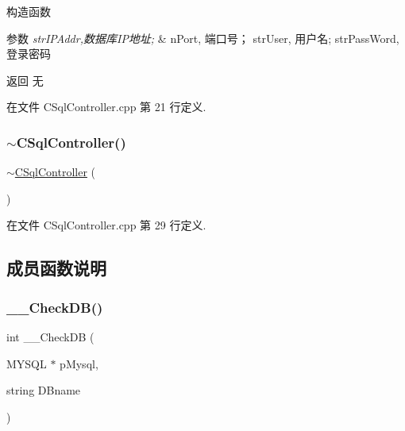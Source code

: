 构造函数 


\begin{DoxyParams}{参数}
{\em str\+I\+P\+Addr,数据库\+I\+P地址;} & n\+Port, 端口号； str\+User, 用户名; str\+Pass\+Word, 登录密码\\
\hline
\end{DoxyParams}
\begin{DoxyReturn}{返回}
无 
\end{DoxyReturn}


在文件 C\+Sql\+Controller.\+cpp 第 21 行定义.

\mbox{\label{class_c_sql_controller_add361c4b54568fcfe57fce584859ee84}} 
\subsubsection{\texorpdfstring{$\sim$\+C\+Sql\+Controller()}{~CSqlController()}}
{\footnotesize\ttfamily $\sim$\hyperlink{class_c_sql_controller}{C\+Sql\+Controller} (\begin{DoxyParamCaption}{ }\end{DoxyParamCaption})}



在文件 C\+Sql\+Controller.\+cpp 第 29 行定义.



\subsection{成员函数说明}
\mbox{\label{class_c_sql_controller_a6a5d2a26bd4ff8c3b04b2d4c21c73d56}} 
\subsubsection{\texorpdfstring{\+\_\+\+\_\+\+Check\+D\+B()}{\_\_CheckDB()}}
{\footnotesize\ttfamily int \+\_\+\+\_\+\+Check\+DB (\begin{DoxyParamCaption}\item[{M\+Y\+S\+QL $\ast$}]{p\+Mysql,  }\item[{string}]{D\+Bname }\end{DoxyParamCaption})\hspace{0.3cm}{\ttfamily [private]}}



